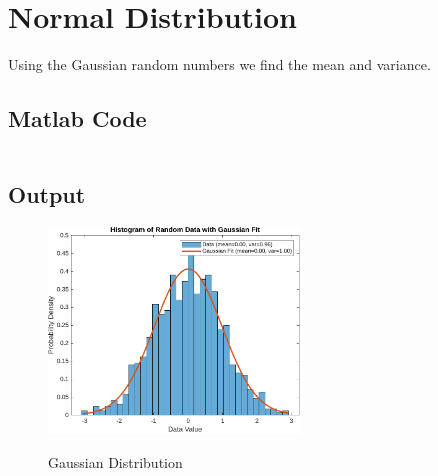\section{Normal Distribution}
\label{sec:Normal Distribution}

Using the Gaussian random numbers we find the mean and variance. 

\subsection{Matlab Code}

\inputminted[fontsize=\footnotesize,autogobble]{matlab}{code/density.m}

\subsection{Output}

\begin{figure}[!htb]
	\centering
	\includegraphics[width=0.6\textwidth]{res/figures/Figure_2.pdf}
	\label{output:gaussian distribution}
	\caption{Gaussian Distribution}
\end{figure}